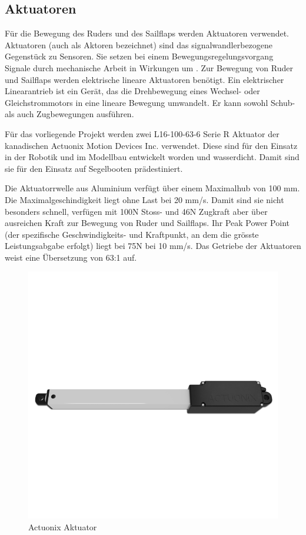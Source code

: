 \subsection{Aktuatoren}
Für die Bewegung des Ruders und des Sailflaps werden Aktuatoren verwendet. Aktuatoren (auch als Aktoren bezeichnet) sind das signalwandlerbezogene Gegenstück zu Sensoren. Sie setzen bei einem Bewegungsregelungsvorgang Signale durch mechanische Arbeit in Wirkungen um \cite{noauthor_aktor_2023}. Zur Bewegung von Ruder und Sailflaps werden elektrische lineare Aktuatoren benötigt. Ein elektrischer Linearantrieb ist ein Gerät, das die Drehbewegung eines Wechsel- oder Gleichstrommotors in eine lineare Bewegung umwandelt. Er kann sowohl Schub- als auch Zugbewegungen ausführen.

Für das vorliegende Projekt werden zwei L16-100-63-6 Serie R Aktuator der kanadischen Actuonix Motion Devices Inc. verwendet. Diese sind für den Einsatz in der Robotik und im Modellbau entwickelt worden und wasserdicht. Damit sind sie für den Einsatz auf Segelbooten prädestiniert.

Die Aktuatorrwelle aus Aluminium verfügt über einem Maximalhub von 100 mm. Die Maximalgeschindigkeit liegt ohne Last bei 20 mm/s. Damit sind sie nicht besonders schnell, verfügen mit 100N Stoss- und 46N Zugkraft aber über ausreichen Kraft zur Bewegung von Ruder und Sailflaps. Ihr Peak Power Point (der spezifische Geschwindigkeits- und Kraftpunkt, an dem die grösste Leistungsabgabe erfolgt) liegt bei 75N bei 10 mm/s. Das Getriebe der Aktuatoren weist eine Übersetzung von 63:1 auf.

\begin{figure}[H] 
    \centering
    \includegraphics[width=0.75\linewidth]{actuonix.png}
    \caption{Actuonix Aktuator}
    \label{fig:actuator}
\end{figure}

